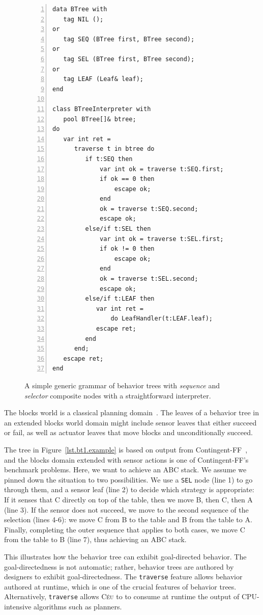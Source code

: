\documentclass{sig-alternate}
\newcommand{\CEU}{\textsc{C\'{e}u}\xspace}
\newcommand{\code}[1] {{\small{\texttt{#1}}}}
\begin{document}
\begin{figure}[t]
\begin{lstlisting}[numbers=left,xleftmargin=3em]
data BTree with
   tag NIL ();
or
   tag SEQ (BTree first, BTree second);
or
   tag SEL (BTree first, BTree second);
or
   tag LEAF (Leaf& leaf);
end

class BTreeInterpreter with
   pool BTree[]& btree;
do
   var int ret =
      traverse t in btree do
         if t:SEQ then
             var int ok = traverse t:SEQ.first;
             if ok == 0 then
                 escape ok;
             end
             ok = traverse t:SEQ.second;
             escape ok;
         else/if t:SEL then
             var int ok = traverse t:SEL.first;
             if ok != 0 then
                 escape ok;
             end
             ok = traverse t:SEL.second;
             escape ok;
         else/if t:LEAF then
            var int ret =
                do LeafHandler(t:LEAF.leaf);
            escape ret;
         end
      end;
   escape ret;
end
\end{lstlisting}
\caption{
A simple generic grammar of behavior trees with \emph{sequence} and 
\emph{selector} composite nodes with a straightforward interpreter.
\label{lst.bt1}
}
\end{figure}

The blocks world is a classical planning domain~\cite{slaney2001blocks}.
The leaves of a behavior tree in an extended blocks world domain
might include sensor leaves that either succeed or fail,
as well as actuator leaves that move blocks and unconditionally succeed.

The tree in Figure~\ref{lst.bt1.example} is based on output from Contingent-FF~\cite{hoffmann2005contingent},
and the blocks domain extended with sensor actions is one of Contingent-FF's benchmark problems.
Here, we want to achieve an ABC stack.
We assume we pinned down the situation to two possibilities.
%
We use a \code{SEL} node (line 1) to go through them,
and a sensor leaf (line 2) to decide which strategy is appropriate:
If it senses that C directly on top of the table,
then we move B, then C, then A (line 3).
If the sensor does not succeed, we move to the second sequence of
the selection (lines 4-6): we move C from B to the table
and B from the table to A. Finally, completing the outer sequence
that applies to both cases, we move C from the table to B (line 7),
thus achieving an ABC stack.

This illustrates how the behavior tree can exhibit goal-directed behavior.
The goal-directedness is not automatic; rather, behavior trees are authored
by designers to exhibit goal-directedness.
The \code{traverse} feature allows behavior authored at runtime,
which is one of the crucial features of behavior trees.
Alternatively, \code{traverse} allows \CEU to
to consume at runtime the output of CPU-intensive algorithms such as planners.
\end{document}

